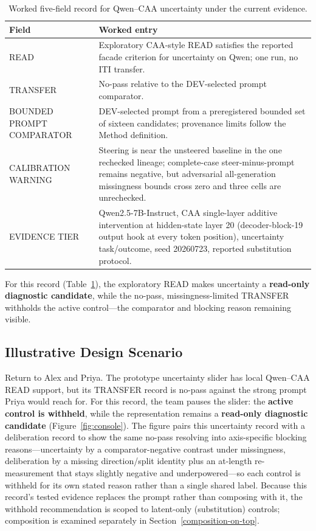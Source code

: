 \documentclass[manuscript,review,anonymous]{acmart}
\newcommand{\TopRule}{\toprule}
\begin{document}
\begin{table}[t]
\centering
\footnotesize
\caption{Worked five-field record for Qwen--CAA uncertainty under the current evidence.}
\label{tab:worked-record}
\begin{tabular}{@{}p{}p{}@{}}
\TopRule
Field & Worked entry \\
\midrule
READ & Exploratory CAA-style READ satisfies the reported facade criterion for uncertainty on Qwen; one run, no ITI transfer. \\
TRANSFER & No-pass relative to the DEV-selected prompt comparator. \\
BOUNDED PROMPT COMPARATOR & DEV-selected prompt from a preregistered bounded set of sixteen candidates; provenance limits follow the Method definition. \\
CALIBRATION WARNING & Steering is near the unsteered baseline in the one rechecked lineage; complete-case steer-minus-prompt remains negative, but adversarial all-generation missingness bounds cross zero and three cells are unrechecked. \\
EVIDENCE TIER & Qwen2.5-7B-Instruct, CAA single-layer additive intervention at hidden-state layer 20 (decoder-block-19 output hook at every token position), uncertainty task/outcome, seed 20260723, reported substitution protocol. \\
\bottomrule
\end{tabular}
\end{table}

For this record (Table~\ref{tab:worked-record}), the exploratory READ makes uncertainty a \textbf{read-only diagnostic candidate}, while the no-pass, missingness-limited TRANSFER withholds the active control---the comparator and blocking reason remaining visible. {}%
{}%

\subsection{Illustrative Design Scenario}\label{illustrative-design-scenario}

Return to Alex and Priya. The prototype uncertainty slider has local Qwen--CAA READ support, but its TRANSFER record is no-pass against the strong prompt Priya would reach for. For this record, the team pauses the slider: the \textbf{active control is withheld}, while the representation remains a \textbf{read-only diagnostic candidate} (Figure~\ref{fig:console}). The figure pairs this uncertainty record with a deliberation record to show the same no-pass resolving into axis-specific blocking reasons---uncertainty by a comparator-negative contrast under missingness, deliberation by a missing direction/split identity plus an at-length re-measurement that stays slightly negative and underpowered---so each control is withheld for its own stated reason rather than a single shared label. Because this record's tested evidence replaces the prompt rather than composing with it, the withhold recommendation is scoped to latent-only (substitution) controls; composition is examined separately in Section~\ref{composition-on-top}.
\end{document}
